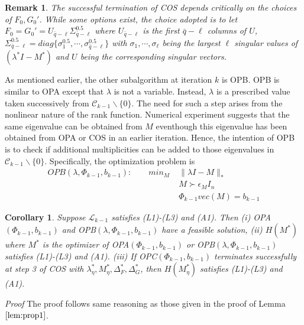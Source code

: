 \documentclass[onecolumn,reviewcopy]{autart}
\def \L{\mathcal{L}}
\def \C{\mathcal{C}}
\newtheorem{remark}{Remark}
\newtheorem{corollary}{Corollary}
\begin{document}
\begin{remark}
The successful termination of COS depends critically on the choices of $F_0, G_0'$. While some options exist, the choice adopted is to let $F_0=G_0'=U_{\bar{q}-\ell} \Sigma_{\bar{q}-\ell}^{0.5}$ where $U_{\bar{q}-\ell}$ is the first ${\bar{q}-\ell}$ columns of $U$, $\Sigma_{\bar{q}-\ell}^{0.5}=diag\{\sigma_1^{0.5}, \cdots, \sigma_{\bar{q}-\ell}^{0.5}\}$ with
$\sigma_1, \cdots, \sigma_\ell$ being the largest $\ell$ singular values of $(\lambda^* I -M^*)$ and $U$ being the corresponding singular vectors.
\end{remark}

As mentioned earlier, the other subalgorithm at iteration $k$ is OPB. OPB is similar to OPA except that $\lambda$ is not a variable. Instead, $\lambda$ is a prescribed value taken successively from $\C_{k-1}\backslash\{0\}$. The need for such a step arises from the nonlinear nature of the rank function. Numerical experiment suggests that the same eigenvalue can be obtained from $M$ eventhough this eigenvalue has been obtained from OPA or COS in an earlier iteration. Hence, the intention of OPB is to check if additional multiplicities can be added to  those eigenvalues in $\C_{k-1}\backslash \{0\}$. Specifically, the optimization problem is
\begin{subequations}\label{eqn:nuclearnorm4}
\begin{align}
OPB(\lambda,\Phi_{k-1},b_{k-1}): \quad \quad min_{M} \; &\|\lambda I - M\|_* \label{eqn:minnuclear4}\\
&M \succ \epsilon_M I_n \label{eqn:Mepsilon4}\\
&\Phi_{k-1} vec(M) = b_{k-1} \label{eqn:Phi4}
\end{align}
\end{subequations}

\begin{corollary} \label{lem:prop2}
Suppose $\L_{k-1}$ satisfies (L1)-(L3) and (A1). Then (i) OPA$(\Phi_{k-1},b_{k-1})$ and OPB$(\lambda,\Phi_{k-1},b_{k-1})$ have a feasible solution, (ii) $H(M^*)$ where $M^*$ is the optimizer of OPA$(\Phi_{k-1},b_{k-1})$ or OPB$(\lambda,\Phi_{k-1},b_{k-1})$ satisfies (L1)-(L3) and (A1). (iii) If OPC$(\Phi_{k-1},b_{k-1})$ terminates successfully at step 3 of COS with $\lambda_\eta^*, M_\eta^*, \Delta_F^*, \Delta_G^*$, then $H(M_\eta^*)$ satisfies (L1)-(L3) and (A1).
\end{corollary}
\textit{Proof} The proof follows same reasoning as those given in the proof of Lemma $\ref{lem:prop1}$.
\end{document}
